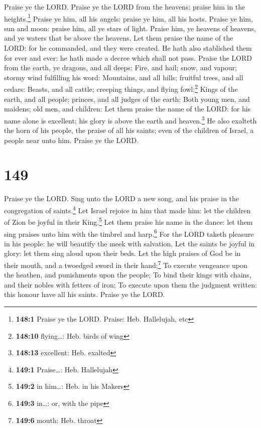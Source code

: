  Praise ye the LORD. Praise ye the LORD from the heavens:
praise him in the heights.\footnote{\textbf{148:1} Praise ye the LORD.
  Praise: Heb. Hallelujah, etc}  Praise ye him, all his
angels: praise ye him, all his hosts.  Praise ye him, sun
and moon: praise him, all ye stars of light.  Praise him,
ye heavens of heavens, and ye waters that be above the heavens.
 Let them praise the name of the LORD: for he commanded,
and they were created.  He hath also stablished them for
ever and ever: he hath made a decree which shall not pass.
 Praise the LORD from the earth, ye dragons, and all
deeps:  Fire, and hail; snow, and vapour; stormy wind
fulfilling his word:  Mountains, and all hills; fruitful
trees, and all cedars:  Beasts, and all cattle; creeping
things, and flying fowl:\footnote{\textbf{148:10} flying\ldots: Heb.
  birds of wing}  Kings of the earth, and all people;
princes, and all judges of the earth:  Both young men,
and maidens; old men, and children:  Let them praise the
name of the LORD: for his name alone is excellent; his glory is above
the earth and heaven.\footnote{\textbf{148:13} excellent: Heb. exalted}
 He also exalteth the horn of his people, the praise of
all his saints; even of the children of Israel, a people near unto him.
Praise ye the LORD.

\hypertarget{section-150}{%
\section{149}\label{section-150}}

 Praise ye the LORD. Sing unto the LORD a new song, and
his praise in the congregation of saints.\footnote{\textbf{149:1}
  Praise\ldots: Heb. Hallelujah}  Let Israel rejoice in
him that made him: let the children of Zion be joyful in their
King.\footnote{\textbf{149:2} in him\ldots: Heb. in his Makers}
 Let them praise his name in the dance: let them sing
praises unto him with the timbrel and harp.\footnote{\textbf{149:3}
  in\ldots: or, with the pipe}  For the LORD taketh
pleasure in his people: he will beautify the meek with salvation.
 Let the saints be joyful in glory: let them sing aloud
upon their beds.  Let the high praises of God be in their
mouth, and a twoedged sword in their hand;\footnote{\textbf{149:6}
  mouth: Heb. throat}  To execute vengeance upon the
heathen, and punishments upon the people;  To bind their
kings with chains, and their nobles with fetters of iron; 
To execute upon them the judgment written: this honour have all his
saints. Praise ye the LORD.

